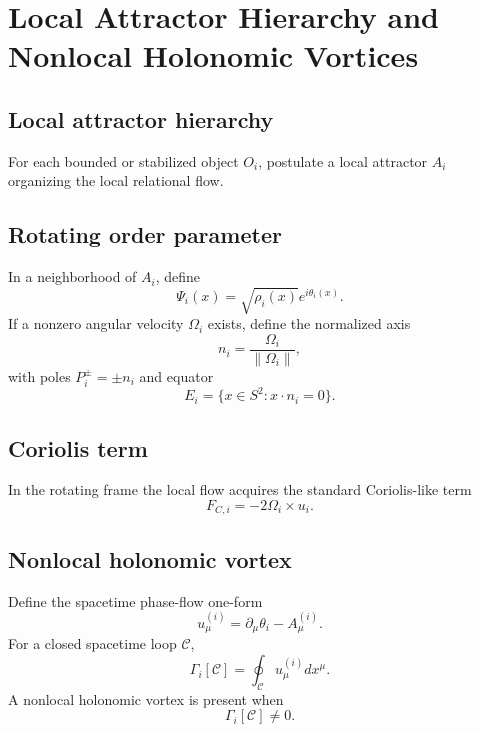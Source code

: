 \section{Local Attractor Hierarchy and Nonlocal Holonomic Vortices}
\label{sec:local-attractor-holonomic-vortex}

\subsection{Local attractor hierarchy}
For each bounded or stabilized object $O_i$, postulate a local attractor $A_i$ organizing the local relational flow.

\subsection{Rotating order parameter}
In a neighborhood of $A_i$, define
\begin{equation}
\Psi_i(x)=\sqrt{\rho_i(x)}e^{i\theta_i(x)}.
\end{equation}
If a nonzero angular velocity $\Omega_i$ exists, define the normalized axis
\begin{equation}
n_i = \frac{\Omega_i}{\|\Omega_i\|},
\end{equation}
with poles $P_i^{\pm}=\pm n_i$ and equator
\begin{equation}
E_i = \{x\in S^2 : x\cdot n_i = 0\}.
\end{equation}

\subsection{Coriolis term}
In the rotating frame the local flow acquires the standard Coriolis-like term
\begin{equation}
F_{C,i} = -2\Omega_i \times u_i.
\end{equation}

\subsection{Nonlocal holonomic vortex}
Define the spacetime phase-flow one-form
\begin{equation}
u^{(i)}_\mu = \partial_\mu \theta_i - A^{(i)}_\mu.
\end{equation}
For a closed spacetime loop $\mathcal C$,
\begin{equation}
\Gamma_i[\mathcal C] = \oint_{\mathcal C} u^{(i)}_\mu dx^\mu.
\end{equation}
A nonlocal holonomic vortex is present when
\begin{equation}
\Gamma_i[\mathcal C] \neq 0.
\end{equation}
